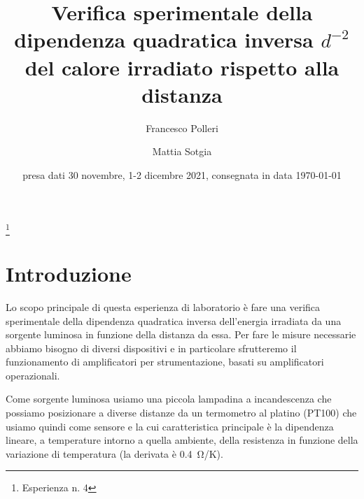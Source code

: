 \documentclass[
    rmp,
    reprint, 
    superscriptaddress, 
    altaffilletter, 
    amsmath, 
    amssymb,
    a4paper]{revtex4-2}
\begin{document}
\title{Verifica sperimentale della dipendenza quadratica inversa $d^{-2}$ del calore irradiato rispetto alla distanza 
}
\thanks{Esperienza n. 4
}

\author{Francesco Polleri}
\author{Mattia Sotgia}


\date{presa dati
    30 novembre, 1-2 dicembre 2021, consegnata in data 
    \today
}

\begin{abstract}
    
\end{abstract}
\maketitle
\thispagestyle{fancy}
\SetBgContents{
}


\section*{Introduzione}
Lo scopo principale di questa esperienza di laboratorio è fare una verifica sperimentale della dipendenza quadratica inversa dell'energia irradiata da una sorgente luminosa in funzione della distanza da essa.
Per fare le misure necessarie abbiamo bisogno di diversi dispositivi e in particolare sfrutteremo il funzionamento di amplificatori per strumentazione, basati su amplificatori operazionali.

Come sorgente luminosa usiamo una piccola lampadina a incandescenza che possiamo posizionare a diverse distanze da un termometro al platino (PT100) che usiamo quindi come sensore e la cui caratteristica principale è la dipendenza lineare, a temperature intorno a quella ambiente, della resistenza in funzione della variazione di temperatura (la derivata è \SI{0.4}{\ohm/\kelvin}). 

\end{document}
